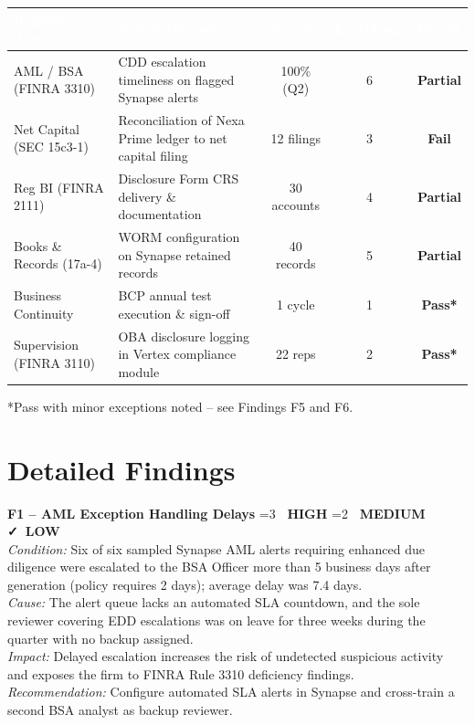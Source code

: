 \documentclass[11pt,a4paper]{scrreprt}
\newcommand{\severitytag}[1]{%
  \ifnum#1=3
    {\color{riskhigh}\bfseries\faExclamationTriangle\ HIGH}%
  \else\ifnum#1=2
    {\color{riskmed}\bfseries\faExclamationTriangle\ MEDIUM}%
  \else
    {\color{risklow}\bfseries\faCheck\ LOW}%
  \fi\fi
}
\begin{document}
\begin{center}
\begin{tabularx}{\linewidth}{@{}p{3.4cm}Xccc@{}}
\toprule
\rowcolor{auditnavy}
\textcolor{white}{\textbf{Regulatory Area}} & \textcolor{white}{\textbf{Test Performed}} &
\textcolor{white}{\textbf{Sample}} & \textcolor{white}{\textbf{Exceptions}} & \textcolor{white}{\textbf{Result}} \\
\midrule
AML / BSA (FINRA 3310) & CDD escalation timeliness on flagged Synapse alerts & 100\% (Q2) & 6 & \textcolor{riskmed}{\bfseries Partial} \\
Net Capital (SEC 15c3-1) & Reconciliation of Nexa Prime ledger to net capital filing & 12 filings & 3 & \textcolor{riskhigh}{\bfseries Fail} \\
Reg BI (FINRA 2111) & Disclosure Form CRS delivery \& documentation & 30 accounts & 4 & \textcolor{riskmed}{\bfseries Partial} \\
Books \& Records (17a-4) & WORM configuration on Synapse retained records & 40 records & 5 & \textcolor{riskmed}{\bfseries Partial} \\
Business Continuity & BCP annual test execution \& sign-off & 1 cycle & 1 & \textcolor{risklow}{\bfseries Pass*} \\
Supervision (FINRA 3110) & OBA disclosure logging in Vertex compliance module & 22 reps & 2 & \textcolor{risklow}{\bfseries Pass*} \\
\bottomrule
\end{tabularx}
\end{center}
{\footnotesize\color{auditslate}*Pass with minor exceptions noted -- see Findings F5 and F6.}

\section*{Detailed Findings}

\begin{tcolorbox}[colback=riskhigh!6,colframe=riskhigh,arc=2pt,boxrule=0.9pt,left=8pt,right=8pt,top=5pt,bottom=5pt,breakable]
\textbf{F1 -- AML Exception Handling Delays} \hfill \severitytag{3}\\[3pt]
\textit{Condition:} Six of six sampled Synapse AML alerts requiring enhanced due diligence
were escalated to the BSA Officer more than 5 business days after generation (policy
requires 2 days); average delay was 7.4 days.\\
\textit{Cause:} The alert queue lacks an automated SLA countdown, and the sole reviewer
covering EDD escalations was on leave for three weeks during the quarter with no backup
assigned.\\
\textit{Impact:} Delayed escalation increases the risk of undetected suspicious activity and
exposes the firm to FINRA Rule 3310 deficiency findings.\\
\textit{Recommendation:} Configure automated SLA alerts in Synapse and cross-train a second
BSA analyst as backup reviewer.
\end{tcolorbox}
\end{document}
